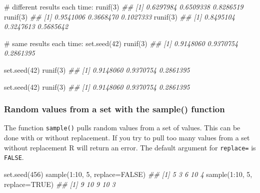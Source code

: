 \documentclass[
  13,
  letterpaper,
]{report}
\newenvironment{Shaded}{\begin{snugshade}}{\end{snugshade}}
\newcommand{\AttributeTok}[1]{\textcolor[rgb]{0.40,0.45,0.13}{#1}}
\newcommand{\CommentTok}[1]{\textcolor[rgb]{0.37,0.37,0.37}{#1}}
\newcommand{\ConstantTok}[1]{\textcolor[rgb]{0.56,0.35,0.01}{#1}}
\newcommand{\DecValTok}[1]{\textcolor[rgb]{0.68,0.00,0.00}{#1}}
\newcommand{\DocumentationTok}[1]{\textcolor[rgb]{0.37,0.37,0.37}{\textit{#1}}}
\newcommand{\FunctionTok}[1]{\textcolor[rgb]{0.28,0.35,0.67}{#1}}
\newcommand{\NormalTok}[1]{\textcolor[rgb]{0.00,0.23,0.31}{#1}}
\newcommand{\SpecialCharTok}[1]{\textcolor[rgb]{0.37,0.37,0.37}{#1}}
\begin{document}
\begin{Shaded}
\begin{Highlighting}[]

\CommentTok{\# different results each time:}
\FunctionTok{runif}\NormalTok{(}\DecValTok{3}\NormalTok{)}
\DocumentationTok{\#\# [1] 0.6297984 0.6509338 0.8286519}
\FunctionTok{runif}\NormalTok{(}\DecValTok{3}\NormalTok{)}
\DocumentationTok{\#\# [1] 0.9541006 0.3668470 0.1027333}
\FunctionTok{runif}\NormalTok{(}\DecValTok{3}\NormalTok{)}
\DocumentationTok{\#\# [1] 0.8495104 0.3247613 0.5685642}

\CommentTok{\# same results each time:}
\FunctionTok{set.seed}\NormalTok{(}\DecValTok{42}\NormalTok{)}
\FunctionTok{runif}\NormalTok{(}\DecValTok{3}\NormalTok{)}
\DocumentationTok{\#\# [1] 0.9148060 0.9370754 0.2861395}

\FunctionTok{set.seed}\NormalTok{(}\DecValTok{42}\NormalTok{)}
\FunctionTok{runif}\NormalTok{(}\DecValTok{3}\NormalTok{)}
\DocumentationTok{\#\# [1] 0.9148060 0.9370754 0.2861395}

\FunctionTok{set.seed}\NormalTok{(}\DecValTok{42}\NormalTok{)}
\FunctionTok{runif}\NormalTok{(}\DecValTok{3}\NormalTok{)}
\DocumentationTok{\#\# [1] 0.9148060 0.9370754 0.2861395}
\end{Highlighting}
\end{Shaded}

\subsubsection{Random values from a set with the sample()
function}\label{sec-manip-make-rand-samp}

The function \texttt{sample()} pulls random values from a set of values.
This can be done with or without replacement. If you try to pull too
many values from a set without replacement R will return an error. The
default argument for \texttt{replace=} is \texttt{FALSE}.

\begin{Shaded}
\begin{Highlighting}[]
\FunctionTok{set.seed}\NormalTok{(}\DecValTok{456}\NormalTok{)}
\FunctionTok{sample}\NormalTok{(}\DecValTok{1}\SpecialCharTok{:}\DecValTok{10}\NormalTok{, }\DecValTok{5}\NormalTok{, }\AttributeTok{replace=}\ConstantTok{FALSE}\NormalTok{) }
\DocumentationTok{\#\# [1]  5  3  6 10  4}
\FunctionTok{sample}\NormalTok{(}\DecValTok{1}\SpecialCharTok{:}\DecValTok{10}\NormalTok{, }\DecValTok{5}\NormalTok{, }\AttributeTok{replace=}\ConstantTok{TRUE}\NormalTok{)}
\DocumentationTok{\#\# [1]  9 10  9 10  3}
\end{Highlighting}
\end{Shaded}
\end{document}
